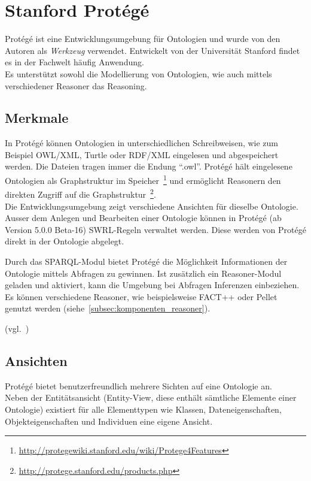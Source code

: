 \section{Stanford Protégé}
\label{sec:komponenten_protege}
Protégé ist eine Entwicklungsumgebung für Ontologien und wurde von den Autoren als \textit{Werkzeug} verwendet. Entwickelt von der Universität Stanford findet es in der Fachwelt häufig Anwendung.\\
Es unterstützt sowohl die Modellierung von Ontologien, wie auch mittels verschiedener Reasoner das Reasoning.

\subsection{Merkmale}
\label{subsec:komponenten_protege_features}
In Protégé können Ontologien in unterschiedlichen Schreibweisen, wie zum Beispiel OWL/XML, Turtle oder RDF/XML eingelesen und abgespeichert werden. Die Dateien tragen immer die Endung ``.owl''. Protégé hält eingelesene Ontologien als Graphstruktur im Speicher~\footnote{\url{http://protegewiki.stanford.edu/wiki/Protege4Features}} und ermöglicht Reasonern den direkten Zugriff auf die Graphstruktur~\footnote{\url{http://protege.stanford.edu/products.php}}.\\
Die Entwicklungsumgebung zeigt verschiedene Ansichten für dieselbe Ontologie. \\
Ausser dem Anlegen und Bearbeiten einer Ontologie können in Protégé (ab Version 5.0.0 Beta-16) SWRL-Regeln verwaltet werden. Diese werden von Protégé direkt in der Ontologie abgelegt.

Durch das SPARQL-Modul bietet Protégé die Möglichkeit Informationen der Ontologie mittels Abfragen zu gewinnen. Ist zusätzlich ein Reasoner-Modul geladen und aktiviert, kann die Umgebung bei Abfragen Inferenzen einbeziehen. Es können verschiedene Reasoner, wie beispielsweise FACT++ oder Pellet genutzt werden (siehe~\ref{subsec:komponenten_reasoner}).

(vgl.~\cite{protegeFeatures})

\subsection{Ansichten}
\label{subsec:komponenten_protege_view}
Protégé bietet benutzerfreundlich mehrere Sichten auf eine Ontologie an.\\
Neben der Entitätsansicht (Entity-View, diese enthält sämtliche Elemente einer Ontologie) existiert für alle Elementtypen wie Klassen, Dateneigenschaften, Objekteigenschaften und Individuen eine eigene Ansicht.

